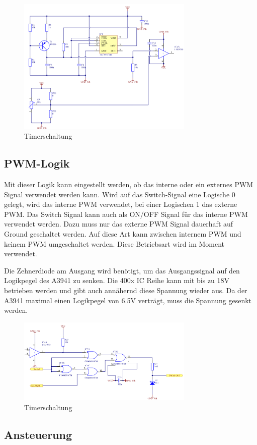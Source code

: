 \begin{figure}[h!]
	\centering
	\includegraphics[width=0.75\textwidth]{src/dc/fig/timer_schematic.png}
	\caption{Timerschaltung}
\end{figure}

\subsection{PWM-Logik}
Mit dieser Logik kann eingestellt werden, ob das interne oder ein externes
PWM Signal verwendet werden kann. Wird auf das Switch-Signal eine Logische
0 gelegt, wird das interne PWM verwendet, bei einer Logischen 1 das externe
PWM. Das Switch Signal kann auch als ON/OFF Signal für das interne PWM
verwendet werden. Dazu muss nur das externe PWM Signal dauerhaft auf Ground
geschaltet werden. Auf diese Art kann zwischen internem PWM und keinem PWM
umgeschaltet werden. Diese Betriebsart wird im Moment verwendet.

Die Zehnerdiode am Ausgang wird benötigt, um das Ausgangssignal auf den
Logikpegel des A3941 zu senken. Die 400x IC Reihe kann mit bis zu 18V
betrieben werden und gibt auch annähernd diese Spannung wieder aus. Da der
A3941 maximal einen Logikpegel von 6.5V verträgt, muss die Spannung
gesenkt werden.

\begin{figure}[h!]
	\centering
	\includegraphics[width=0.75\textwidth]{src/dc/fig/pwm_schematic.png}
	\caption{Timerschaltung}
\end{figure}


\subsection{Ansteuerung}

